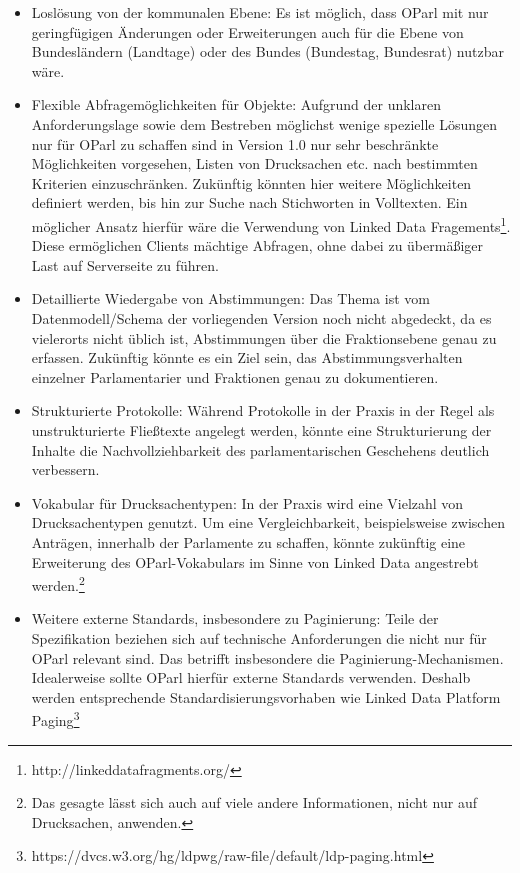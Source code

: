 \documentclass[,a4paper]{article}
\begin{document}
\begin{itemize}
\item
  Loslösung von der kommunalen Ebene: Es ist möglich, dass OParl mit nur
  geringfügigen Änderungen oder Erweiterungen auch für die Ebene von
  Bundesländern (Landtage) oder des Bundes (Bundestag, Bundesrat)
  nutzbar wäre.
\item
  Flexible Abfragemöglichkeiten für Objekte: Aufgrund der unklaren
  Anforderungslage sowie dem Bestreben möglichst wenige spezielle
  Lösungen nur für OParl zu schaffen sind in Version 1.0 nur sehr
  beschränkte Möglichkeiten vorgesehen, Listen von Drucksachen etc. nach
  bestimmten Kriterien einzuschränken. Zukünftig könnten hier weitere
  Möglichkeiten definiert werden, bis hin zur Suche nach Stichworten in
  Volltexten. Ein möglicher Ansatz hierfür wäre die Verwendung von
  Linked Data Fragements\footnote{http://linkeddatafragments.org/}.
  Diese ermöglichen Clients mächtige Abfragen, ohne dabei zu übermäßiger
  Last auf Serverseite zu führen.
\item
  Detaillierte Wiedergabe von Abstimmungen: Das Thema ist vom
  Datenmodell/Schema der vorliegenden Version noch nicht abgedeckt, da
  es vielerorts nicht üblich ist, Abstimmungen über die Fraktionsebene
  genau zu erfassen. Zukünftig könnte es ein Ziel sein, das
  Abstimmungsverhalten einzelner Parlamentarier und Fraktionen genau zu
  dokumentieren.
\item
  Strukturierte Protokolle: Während Protokolle in der Praxis in der
  Regel als unstrukturierte Fließtexte angelegt werden, könnte eine
  Strukturierung der Inhalte die Nachvollziehbarkeit des
  parlamentarischen Geschehens deutlich verbessern.
\item
  Vokabular für Drucksachentypen: In der Praxis wird eine Vielzahl von
  Drucksachentypen genutzt. Um eine Vergleichbarkeit, beispielsweise
  zwischen Anträgen, innerhalb der Parlamente zu schaffen, könnte
  zukünftig eine Erweiterung des OParl-Vokabulars im Sinne von Linked
  Data angestrebt werden.\footnote{Das gesagte lässt sich auch auf viele
    andere Informationen, nicht nur auf Drucksachen, anwenden.}
\item
  Weitere externe Standards, insbesondere zu Paginierung: Teile der
  Spezifikation beziehen sich auf technische Anforderungen die nicht nur
  für OParl relevant sind. Das betrifft insbesondere die
  Paginierung-Mechanismen. Idealerweise sollte OParl hierfür externe
  Standards verwenden. Deshalb werden entsprechende
  Standardisierungsvorhaben wie Linked Data Platform Paging\footnote{https://dvcs.w3.org/hg/ldpwg/raw-file/default/ldp-paging.html}

\end{itemize}
\end{document}
